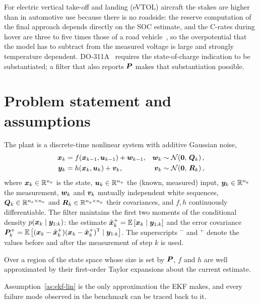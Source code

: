 For electric vertical take-off and landing (eVTOL) aircraft the stakes are higher than in
automotive use because there is no roadside: the reserve computation of the final approach
depends directly on the SOC estimate, and the C-rates during hover are three to five times
those of a road vehicle~\cite{yang2021evtol,fredericks2018vtol}, so the overpotential that
the model has to subtract from the measured voltage is large and strongly temperature
dependent. DO-311A~\cite{rtca2017do311a} requires the state-of-charge indication to be
substantiated; a filter that also reports $\bm{P}$ makes that substantiation possible.

\section{Problem statement and assumptions}
The plant is a discrete-time nonlinear system with additive Gaussian noise,
\begin{align}
\bm{x}_{k} &= f(\bm{x}_{k-1}, \bm{u}_{k-1}) + \bm{w}_{k-1}, & \bm{w}_k &\sim \mathcal{N}\!\left(\bm{0},\,\bm{Q}_k\right), \label{eq:ekf-proc}\\
\bm{y}_{k} &= h(\bm{x}_{k}, \bm{u}_{k}) + \bm{v}_{k},       & \bm{v}_k &\sim \mathcal{N}\!\left(\bm{0},\,\bm{R}_k\right), \label{eq:ekf-meas}
\end{align}
where $\bm{x}_k\in\mathbb{R}^{n_x}$ is the state, $\bm{u}_k\in\mathbb{R}^{n_u}$ the (known, measured) input,
$\bm{y}_k\in\mathbb{R}^{n_y}$ the measurement, $\bm{w}_k$ and $\bm{v}_k$ mutually independent white
sequences, $\bm{Q}_k\in\mathbb{R}^{n_x\times n_x}$ and $\bm{R}_k\in\mathbb{R}^{n_y\times n_y}$ their
covariances, and $f,h$ continuously differentiable. The filter maintains the first two
moments of the conditional density $p(\bm{x}_k\mid \bm{y}_{1:k})$: the estimate
$\hat{\bm{x}}^{+}_k = \mathbb{E}\left[\bm{x}_k \mid \bm{y}_{1:k}\right]$ and the error covariance
$\bm{P}^{+}_k = \mathbb{E}\left[(\bm{x}_k-\hat{\bm{x}}^{+}_k)(\bm{x}_k-\hat{\bm{x}}^{+}_k)^{\mathsf{T}} \mid \bm{y}_{1:k}\right]$. The superscripts $^-$
and $^+$ denote the values before and after the measurement of step $k$ is used.

\begin{assumption}\label{as:ekf-lin}
Over a region of the state space whose size is set by $\bm{P}$, $f$ and $h$ are well
approximated by their first-order Taylor expansions about the current estimate.
\end{assumption}
Assumption~\ref{as:ekf-lin} is the only approximation the EKF makes, and every failure mode
observed in the benchmark can be traced back to it.

